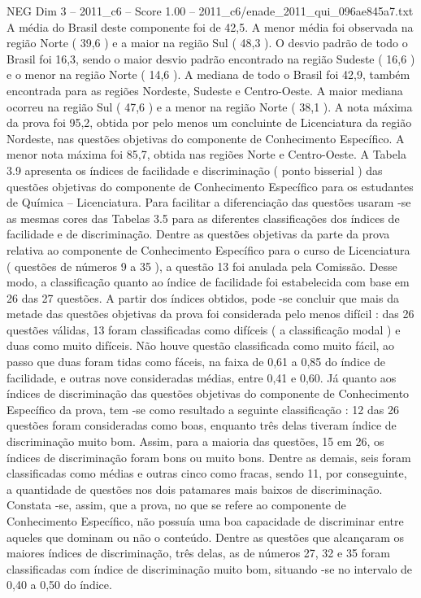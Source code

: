 \begin{textsample}{NEG Dim 3 – 2011\_c6 – Score 1.00 – 2011\_c6/enade\_2011\_qui\_096ae845a7.txt}
A média do Brasil deste componente foi de 42,5.
A menor média foi observada na região Norte ( 39,6 ) e a maior na região Sul ( 48,3 ).
O desvio padrão de todo o Brasil foi 16,3, sendo o maior desvio padrão encontrado na região Sudeste ( 16,6 ) e o menor na região Norte ( 14,6 ).
A mediana de todo o Brasil foi 42,9, também encontrada para as regiões Nordeste, Sudeste e Centro-Oeste.
A maior mediana ocorreu na região Sul ( 47,6 ) e a menor na região Norte ( 38,1 ).
A nota máxima da prova foi 95,2, obtida por pelo menos um concluinte de Licenciatura da região Nordeste, nas questões objetivas do componente de Conhecimento Específico.
A menor nota máxima foi 85,7, obtida nas regiões Norte e Centro-Oeste.
A Tabela 3.9 apresenta os índices de facilidade e discriminação ( ponto bisserial ) das questões objetivas do componente de Conhecimento Específico para os estudantes de Química – Licenciatura.
Para facilitar a diferenciação das questões usaram -se as mesmas cores das Tabelas 3.5 para as diferentes classificações dos índices de facilidade e de discriminação.
Dentre as questões objetivas da parte da prova relativa ao componente de Conhecimento Específico para o curso de Licenciatura ( questões de números 9 a 35 ), a questão 13 foi anulada pela Comissão.
Desse modo, a classificação quanto ao índice de facilidade foi estabelecida com base em 26 das 27 questões.
A partir dos índices obtidos, pode -se concluir que mais da metade das questões objetivas da prova foi considerada pelo menos difícil : das 26 questões válidas, 13 foram classificadas como difíceis ( a classificação modal ) e duas como muito difíceis.
Não houve questão classificada como muito fácil, ao passo que duas foram tidas como fáceis, na faixa de 0,61 a 0,85 do índice de facilidade, e outras nove consideradas médias, entre 0,41 e 0,60.
Já quanto aos índices de discriminação das questões objetivas do componente de Conhecimento Específico da prova, tem -se como resultado a seguinte classificação : 12 das 26 questões foram consideradas como boas, enquanto três delas tiveram índice de discriminação muito bom.
Assim, para a maioria das questões, 15 em 26, os índices de discriminação foram bons ou muito bons.
Dentre as demais, seis foram classificadas como médias e outras cinco como fracas, sendo 11, por conseguinte, a quantidade de questões nos dois patamares mais baixos de discriminação.
Constata -se, assim, que a prova, no que se refere ao componente de Conhecimento Específico, não possuía uma boa capacidade de discriminar entre aqueles que dominam ou não o conteúdo.
Dentre as questões que alcançaram os maiores índices de discriminação, três delas, as de números 27, 32 e 35 foram classificadas com índice de discriminação muito bom, situando -se no intervalo de 0,40 a 0,50 do índice.

\end{textsample}

